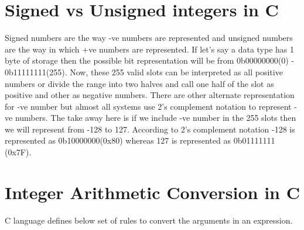 \documentclass{article}
\begin{document}
\section{Signed vs Unsigned integers in C}
Signed numbers are the way -ve numbers are represented and unsigned numbers are
the way in which +ve numbers are represented. If let's say a data type has 1
byte of storage then the possible bit representation will be from  0b00000000(0)
- 0b11111111(255). Now, these 255 valid slots can be interpreted as all positive
numbers or divide the range into two halves and call one half of the slot as
positive and other as negative numbers. There are other alternate representation
for -ve number but almost all systems use 2's complement notation to represent
-ve numbers. The take away here is if we include -ve number in the 255 slots
then we will represent from -128 to 127. According to 2's complement notation
-128 is represented as 0b10000000(0x80) whereas 127 is represented as 0b01111111
(0x7F).

\section{Integer Arithmetic Conversion in C}
C language defines below set of rules to convert the arguments in an expression.
\end{document}
